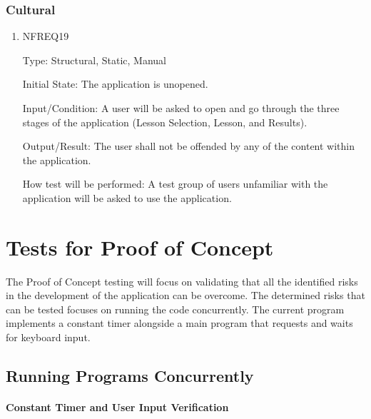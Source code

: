 \documentclass[12pt, titlepage]{article}
\begin{document}
\subsubsection{Cultural}
\begin{enumerate}

\item{NFREQ19\\}

Type: Structural, Static, Manual
					
Initial State: The application is unopened.
					
Input/Condition: A user will be asked to open and go through the three stages of the application (Lesson Selection, Lesson, and Results).
					
Output/Result: The user shall not be offended by any of the content within the application.
					
How test will be performed: A test group of users unfamiliar with the application will be asked to use the application. 
\end{enumerate}

\section{Tests for Proof of Concept}

The Proof of Concept testing will focus on validating that all the identified risks in the development of the application can be overcome. The determined risks that can be tested focuses on running the code concurrently. The current program implements a constant timer alongside a main program that requests and waits for keyboard input. 

\subsection{Running Programs Concurrently}
		
\paragraph{Constant Timer and User Input Verification}
\end{document}
